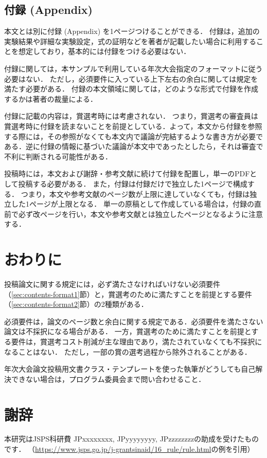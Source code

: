 \documentclass[
  platex, dvipdfmx,  %
]{nlp2025}
\begin{document}
\subsection{付録 (Appendix)}
\label{sec:appendix}
本文とは別に付録 (Appendix) を1ページつけることができる．
付録は，追加の実験結果や詳細な実験設定，式の証明などを著者が記載したい場合に利用することを想定しており，基本的には付録をつける必要はない．

付録に関しては，本サンプルで利用している年次大会指定のフォーマットに従う必要はない．
ただし，必須要件に入っている上下左右の余白に関しては規定を満たす必要がある．
付録の本文領域に関しては，どのような形式で付録を作成するかは著者の裁量による．

付録に記載の内容は，賞選考時には考慮されない．
つまり，賞選考の審査員は賞選考時に付録を読まないことを前提としている．よって，本文から付録を参照する際には，その参照がなくても本文内で議論が完結するような書き方が必要である．逆に付録の情報に基づいた議論が本文中であったとしたら，それは審査で不利に判断される可能性がある．



投稿時には，本文および謝辞・参考文献に続けて付録を配置し，単一のPDFとして投稿する必要がある．
また，付録は付録だけで独立した1ページで構成する．
つまり，本文や参考文献のページ数が上限に達していなくても，付録は独立した1ページが上限となる．
単一の原稿として作成している場合は，付録の直前で必ず改ページを行い，本文や参考文献とは独立したページとなるように注意する．


\section{おわりに}
投稿論文に関する規定には，必ず満たさなければいけない必須要件（\ref{sec:contents-format1}節）と，賞選考のために満たすことを前提とする要件（\ref{sec:contents-format2}節）の2種類がある．

必須要件は，論文のページ数と余白に関する規定である．必須要件を満たさない論文は不採択になる場合がある．
一方，賞選考のために満たすことを前提とする要件は，賞選考コスト削減が主な理由であり，満たされていなくても不採択になることはない．
ただし，一部の賞の選考過程から除外されることがある．

年次大会論文投稿用文書クラス・テンプレートを使った執筆がどうしても自己解決できない場合は，プログラム委員会まで問い合わせること．





\newpage
\section*{謝辞}
本研究はJSPS科研費 JPxxxxxxxx, JPyyyyyyyy, JPzzzzzzzzの助成を受けたものです．
（\url{https://www.jsps.go.jp/j-grantsinaid/16_rule/rule.html}の例を引用）
\end{document}
